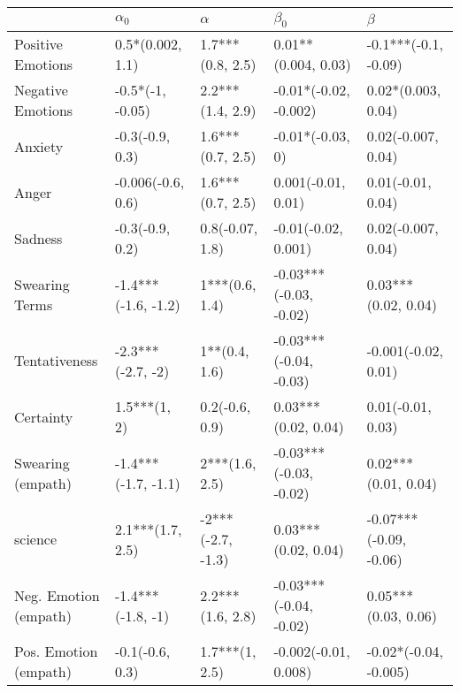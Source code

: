 \begin{tabular}{lllll}
\toprule
{} &           $\alpha_0$ &           $\alpha$ &               $\beta_0$ &                 $\beta$ \\
\midrule
Positive Emotions     &     0.5*(0.002, 1.1) &   1.7***(0.8, 2.5) &     0.01**(0.004, 0.03) &    -0.1***(-0.1, -0.09) \\
Negative Emotions     &     -0.5*(-1, -0.05) &   2.2***(1.4, 2.9) &   -0.01*(-0.02, -0.002) &      0.02*(0.003, 0.04) \\
Anxiety               &      -0.3(-0.9, 0.3) &   1.6***(0.7, 2.5) &        -0.01*(-0.03, 0) &      0.02(-0.007, 0.04) \\
Anger                 &    -0.006(-0.6, 0.6) &   1.6***(0.7, 2.5) &      0.001(-0.01, 0.01) &       0.01(-0.01, 0.04) \\
Sadness               &      -0.3(-0.9, 0.2) &    0.8(-0.07, 1.8) &     -0.01(-0.02, 0.001) &      0.02(-0.007, 0.04) \\
Swearing Terms        &  -1.4***(-1.6, -1.2) &     1***(0.6, 1.4) &  -0.03***(-0.03, -0.02) &     0.03***(0.02, 0.04) \\
Tentativeness         &    -2.3***(-2.7, -2) &      1**(0.4, 1.6) &  -0.03***(-0.04, -0.03) &     -0.001(-0.02, 0.01) \\
Certainty             &         1.5***(1, 2) &     0.2(-0.6, 0.9) &     0.03***(0.02, 0.04) &       0.01(-0.01, 0.03) \\
Swearing (empath)     &  -1.4***(-1.7, -1.1) &     2***(1.6, 2.5) &  -0.03***(-0.03, -0.02) &     0.02***(0.01, 0.04) \\
science               &     2.1***(1.7, 2.5) &  -2***(-2.7, -1.3) &     0.03***(0.02, 0.04) &  -0.07***(-0.09, -0.06) \\
Neg. Emotion (empath) &    -1.4***(-1.8, -1) &   2.2***(1.6, 2.8) &  -0.03***(-0.04, -0.02) &     0.05***(0.03, 0.06) \\
Pos. Emotion (empath) &      -0.1(-0.6, 0.3) &     1.7***(1, 2.5) &    -0.002(-0.01, 0.008) &   -0.02*(-0.04, -0.005) \\
\bottomrule
\end{tabular}
